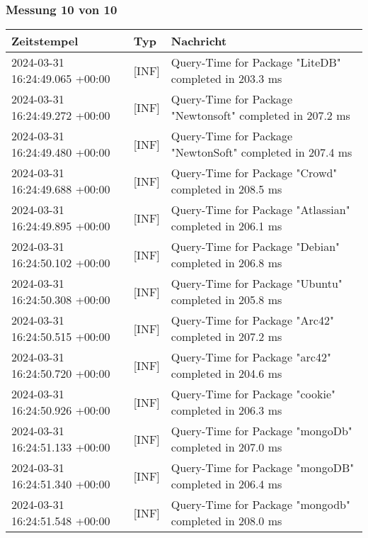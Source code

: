     \subsubsection*{Messung 10 von 10} \label{subsubsec:MySQLOhneIndex10von10}
        {
            {\small
                \begin{tabularx}{\textwidth}{|l|l|X|}
                    \hline
                    \textbf{Zeitstempel} & \textbf{Typ} & \textbf{Nachricht} \\
                    \hline
                    \endhead
                    2024-03-31 16:24:49.065 +00:00 & [INF] & Query-Time for Package "LiteDB" completed in 203.3 ms \\
                    2024-03-31 16:24:49.272 +00:00 & [INF] & Query-Time for Package "Newtonsoft" completed in 207.2 ms \\
                    2024-03-31 16:24:49.480 +00:00 & [INF] & Query-Time for Package "NewtonSoft" completed in 207.4 ms \\
                    2024-03-31 16:24:49.688 +00:00 & [INF] & Query-Time for Package "Crowd" completed in 208.5 ms \\
                    2024-03-31 16:24:49.895 +00:00 & [INF] & Query-Time for Package "Atlassian" completed in 206.1 ms \\
                    2024-03-31 16:24:50.102 +00:00 & [INF] & Query-Time for Package "Debian" completed in 206.8 ms \\
                    2024-03-31 16:24:50.308 +00:00 & [INF] & Query-Time for Package "Ubuntu" completed in 205.8 ms \\
                    2024-03-31 16:24:50.515 +00:00 & [INF] & Query-Time for Package "Arc42" completed in 207.2 ms \\
                    2024-03-31 16:24:50.720 +00:00 & [INF] & Query-Time for Package "arc42" completed in 204.6 ms \\
                    2024-03-31 16:24:50.926 +00:00 & [INF] & Query-Time for Package "cookie" completed in 206.3 ms \\
                    2024-03-31 16:24:51.133 +00:00 & [INF] & Query-Time for Package "mongoDb" completed in 207.0 ms \\
                    2024-03-31 16:24:51.340 +00:00 & [INF] & Query-Time for Package "mongoDB" completed in 206.4 ms \\
                    2024-03-31 16:24:51.548 +00:00 & [INF] & Query-Time for Package "mongodb" completed in 208.0 ms \\

\end{tabularx}}}
